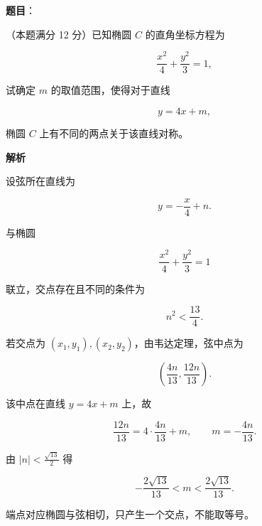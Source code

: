\begin{answer}

\textbf{题目}：

（本题满分 12 分）已知椭圆 $C$ 的直角坐标方程为

\nopagebreak[4]
\[
\frac{x^2}{4}+\frac{y^2}{3}=1,
\]

试确定 $m$ 的取值范围，使得对于直线

\nopagebreak[4]
\[
y=4x+m,
\]

椭圆 $C$ 上有不同的两点关于该直线对称。

\textbf{解析}

设弦所在直线为

\nopagebreak[4]
\[
y=-\frac x4+n.
\]

与椭圆

\nopagebreak[4]
\[
\frac{x^2}{4}+\frac{y^2}{3}=1
\]

联立，交点存在且不同的条件为

\nopagebreak[4]
\[
n^2<\frac{13}{4}.
\]

若交点为 $(x_1,y_1),(x_2,y_2)$，由韦达定理，弦中点为

\nopagebreak[4]
\[
\left(\frac{4n}{13},\frac{12n}{13}\right).
\]

该中点在直线 $y=4x+m$ 上，故

\nopagebreak[4]
\[
\frac{12n}{13}
=4\cdot\frac{4n}{13}+m,
\qquad
m=-\frac{4n}{13}.
\]

由 $|n|<\frac{\sqrt{13}}2$ 得

\nopagebreak[4]
\[
-\frac{2\sqrt{13}}{13}
<m<
\frac{2\sqrt{13}}{13}.
\]

端点对应椭圆与弦相切，只产生一个交点，不能取等号。


\end{answer}
